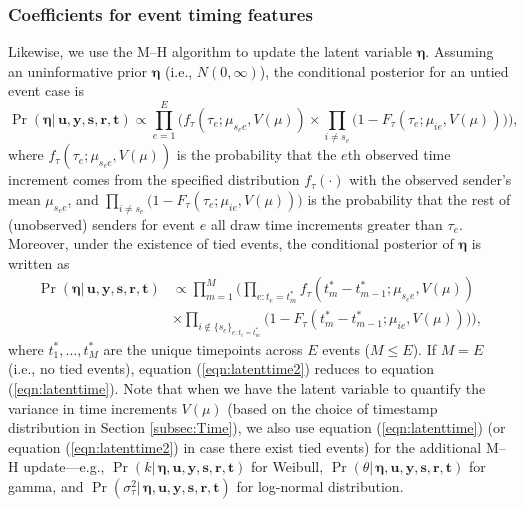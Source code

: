 \documentclass[ba]{imsart}
\numberwithin{equation}{section}
\theoremstyle{plain}
\begin{document}
	\subsubsection{Coefficients for event timing features}
	Likewise, we use the M--H algorithm to update the latent variable $\boldsymbol{\eta}$. Assuming an uninformative prior $\boldsymbol{\eta}$ (i.e., $N({0},\infty)$), the conditional posterior for an untied event case is
	\begin{equation}
		\Pr(\boldsymbol{\eta}|\, \boldsymbol{u}, \boldsymbol{y},\boldsymbol{s}, \boldsymbol{r},\boldsymbol{t})\propto \prod_{e=1}^E\Big(f_{\tau}(\tau_{e}; \mu_{s_e e}, V(\mu))\times \prod_{i\neq s_e}\big(1-F_{\tau}(\tau_{e}; \mu_{ie}, V(\mu)) \big)\Big),
		\label{eqn:latenttime}
	\end{equation}
	where $f_{\tau}(\tau_{e}; \mu_{s_e e}, V(\mu))$ is the probability that the $e$th observed time increment comes from the specified distribution $f_\tau(\cdot)$ with the observed sender's mean $\mu_{s_e e}$, and $\prod_{i\neq s_e}\big(1-F_{\tau}(\tau_{e}; \mu_{ie},V(\mu)) \big)$ is the probability that the rest of (unobserved) senders for event $e$ all draw time increments greater than $\tau_e$. Moreover, under the existence of tied events, the conditional posterior of $\boldsymbol{\eta}$ is written as
	\begin{equation}
		\begin{aligned}
			\Pr(\boldsymbol{\eta}|\, \boldsymbol{u}, \boldsymbol{y},\boldsymbol{s}, \boldsymbol{r},\boldsymbol{t})&\propto \prod_{m=1}^M\Big(\prod_{e:t_e=t_m^*}f_{\tau}(t_m^*-t_{m-1}^*; \mu_{s_e e}, V(\mu)) \\&\times \prod_{i \notin \{s_e\}_{e:t_e=t_m^*}}\big(1-F_{\tau}(t_m^*-t_{m-1}^*; \mu_{ie}, V(\mu)) \big)\Big),
		\end{aligned}
		\label{eqn:latenttime2}
	\end{equation}
	where $t_1^*,\ldots,t_M^*$ are the unique timepoints across $E$ events ($M \leq E$). If $M=E$ (i.e., no tied events), equation (\ref{eqn:latenttime2}) reduces to equation (\ref{eqn:latenttime}). Note that when we have the latent variable to quantify the variance in time increments $V(\mu)$ (based on the choice of timestamp distribution in Section \ref{subsec:Time}), we also use equation (\ref{eqn:latenttime}) (or equation (\ref{eqn:latenttime2}) in case there exist tied events) for the additional M--H update---e.g., $\Pr(k|\, \boldsymbol{\eta},\boldsymbol{u}, \boldsymbol{y},\boldsymbol{s}, \boldsymbol{r},\boldsymbol{t})$ for Weibull, $\Pr(\theta|\, \boldsymbol{\eta},\boldsymbol{u}, \boldsymbol{y},\boldsymbol{s}, \boldsymbol{r},\boldsymbol{t})$ for gamma, and  $\Pr(\sigma^2_\tau| \,\boldsymbol{\eta},\boldsymbol{u}, \boldsymbol{y},\boldsymbol{s}, \boldsymbol{r},\boldsymbol{t})$ for log-normal distribution.
\end{document}

